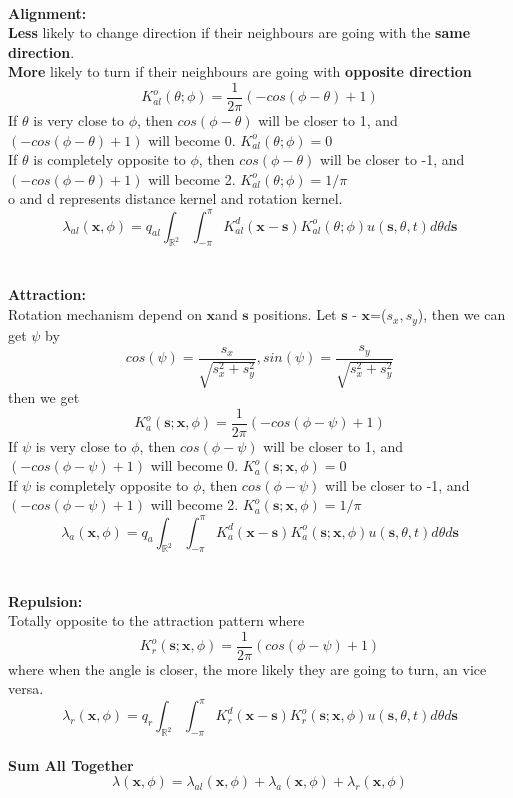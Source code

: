 \documentclass{article}
\begin{document}
\\
\textbf{Alignment:}\\
\textbf{Less} likely to change direction if their neighbours are going with the \textbf{same direction}.\\
\textbf{More} likely to turn if their neighbours are going with \textbf{opposite direction}\\
$$K^{o}_{al}(\theta;\phi)=\frac{1}{2\pi}(-cos(\phi-\theta)+1)$$
If $\theta$ is very close to $\phi$, then $cos(\phi-\theta)$ will be closer to 1, and $(-cos(\phi-\theta)+1)$ will become 0.  $K^{o}_{al}(\theta;\phi)=0$\\
If $\theta$ is completely opposite to $\phi$, then $cos(\phi-\theta)$ will be closer to -1, and $(-cos(\phi-\theta)+1)$ will become 2. $K^{o}_{al}(\theta;\phi)=1/\pi$\\
o and d represents distance kernel and rotation kernel.
$$\lambda_{al}(\boldsymbol{x},\phi)=
q_{al}\int_{\mathbb{R}^2}\int^\pi_{-\pi}K^d_{al}(\boldsymbol{x}-\boldsymbol{s})K^o_{al}(\theta;\phi)u(\boldsymbol{s},\theta,t)d\theta d\boldsymbol{s}$$
\\
\\
\textbf{Attraction:}\\
Rotation mechanism depend on $\boldsymbol{x}$and $\boldsymbol{s}$ positions. Let $\boldsymbol{s}$ - $\boldsymbol{x}$=($s_x,s_y$), then we can get $\psi$ by 
$$cos(\psi)=\frac{s_x}{\sqrt{s_x^2+s_y^2}},sin(\psi)=\frac{s_y}{\sqrt{s_x^2+s_y^2}}$$
then we get 
$$K^{o}_{a}(\boldsymbol{s};\boldsymbol{x},\phi)=\frac{1}{2\pi}(-cos(\phi-\psi)+1)$$
If $\psi$ is very close to $\phi$, then $cos(\phi-\psi)$ will be closer to 1, and $(-cos(\phi-\psi)+1)$ will become 0.  $K^{o}_{a}(\boldsymbol{s};\boldsymbol{x},\phi)=0$\\
If $\psi$ is completely opposite to $\phi$, then $cos(\phi-\psi)$ will be closer to -1, and $(-cos(\phi-\psi)+1)$ will become 2.
$K^{o}_{a}(\boldsymbol{s};\boldsymbol{x},\phi)=1/\pi$
$$\lambda_{a}(\boldsymbol{x},\phi)=
q_{a}\int_{\mathbb{R}^2}\int^\pi_{-\pi}K^d_{a}(\boldsymbol{x}-\boldsymbol{s})K^{o}_{a}(\boldsymbol{s};\boldsymbol{x},\phi)u(\boldsymbol{s},\theta,t)d\theta d\boldsymbol{s}$$
\\
\\
\textbf{Repulsion:}\\
Totally opposite to the attraction pattern where
$$K^{o}_{r}(\boldsymbol{s};\boldsymbol{x},\phi)=\frac{1}{2\pi}(cos(\phi-\psi)+1)$$
where when the angle is closer, the more likely they are going to turn, an vice versa. 
$$\lambda_{r}(\boldsymbol{x},\phi)=
q_{r}\int_{\mathbb{R}^2}\int^\pi_{-\pi}K^d_{r}(\boldsymbol{x}-\boldsymbol{s})K^{o}_{r}(\boldsymbol{s};\boldsymbol{x},\phi)u(\boldsymbol{s},\theta,t)d\theta d\boldsymbol{s}$$
\\
\textbf{Sum All Together}\\
$$\lambda(\boldsymbol{x},\phi)=\lambda_{al}(\boldsymbol{x},\phi)+\lambda_{a}(\boldsymbol{x},\phi)+\lambda_{r}(\boldsymbol{x},\phi)$$
\end{document}
